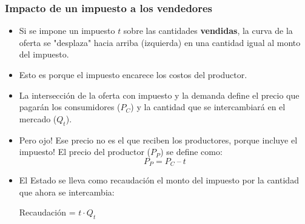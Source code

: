 \documentclass{beamer}
\begin{document}
\begin{frame}
\frametitle{Impacto de un impuesto a los vendedores}
\begin{itemize}
    \item Si se impone un impuesto $t$ sobre las cantidades \textbf{vendidas}, la curva de la oferta se "desplaza" hacia arriba (izquierda) en una cantidad igual al monto del impuesto.
    \item Esto es porque el impuesto encarece los costos del productor. 
    \item La intersección de la oferta con impuesto y la demanda define el precio que pagarán los consumidores ($P_C$) y la cantidad que se intercambiará en el mercado ($Q_t$).
    \item Pero ojo! Ese precio no es el que reciben los productores, porque incluye el impuesto! El precio del productor ($P_P$) se define como:
      \[ P_P=P_C\ – \ t\] 
    \item El Estado se lleva como recaudación el monto del impuesto por la cantidad que ahora se intercambia: \\
    \begin{center}
          Recaudación = $t \cdot Q_t $ 
    \end{center}

\end{itemize}
\end{frame}



\end{document}
